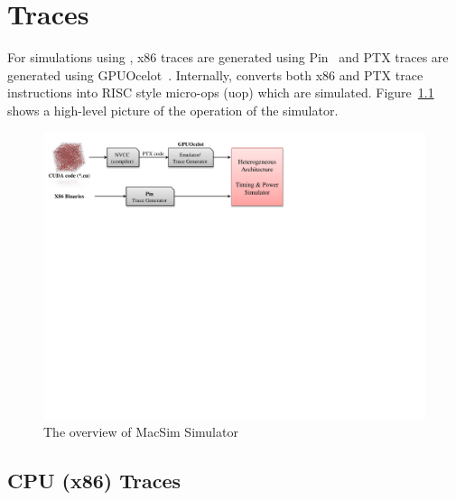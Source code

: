 \chapter{Traces}

For simulations using \SIM, x86 traces are generated using Pin~\cite{pin} and
PTX traces are generated using GPUOcelot~\cite{ocelot}. Internally, \SIM
converts both x86 and PTX trace instructions into RISC style micro-ops (uop)
  which are simulated.  Figure~\ref{fig:overview} shows a high-level picture of
  the operation of the simulator.

\begin{figure}[htb]
\centering \includegraphics{figs/macsim_overview}
\caption{The overview of MacSim Simulator}
\label{fig:overview}
\end{figure}





\section{CPU (x86) Traces}

